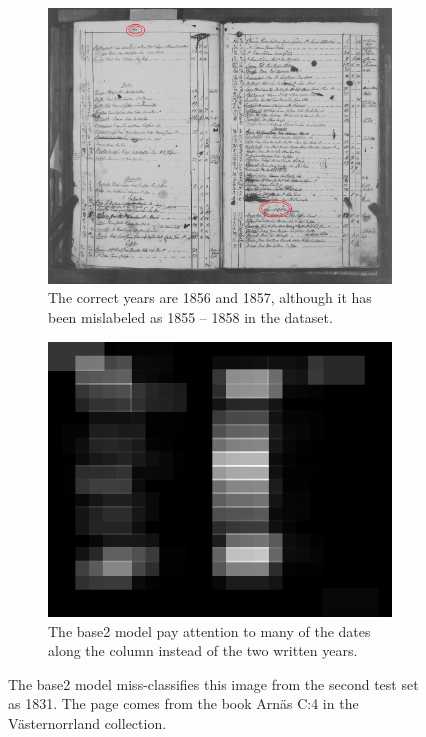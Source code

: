 
\begin{figure}
    \centering
    \begin{subfigure}[c]{1.0\textwidth}
        \centering    \includegraphics[scale=0.56]{resources/SWE_attention/33SQ-GRNM-9CM6.jpg}
        \caption{The correct years are 1856 and 1857, although it has been mislabeled as 1855 -- 1858 in the dataset.}
    \end{subfigure}

    \vspace{1em}

    \begin{subfigure}[t]{1.0\textwidth}
        \centering
        \includegraphics[scale=1.0]{resources/SWE_attention/Base2/att_33SQ-GRNM-9CM6.jpg}
        \caption{The base2 model pay attention to many of the dates along the column instead of the two written years.}
    \end{subfigure}

    \caption{The base2 model miss-classifies this image from the second test set as 1831. The page comes from the book Arnäs C:4 in the Västernorrland collection.}
    \label{fig:attention_dep_9CM6}
\end{figure}
